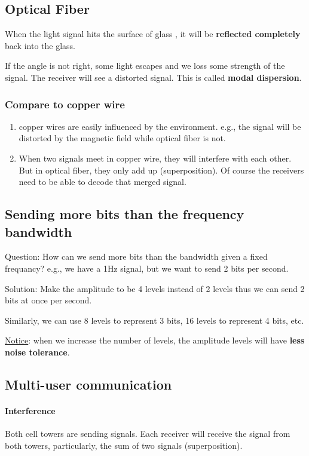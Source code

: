 \documentclass{../../ainote}
\begin{document}
\subsection{Optical Fiber}
When the light signal hits the surface of glass , it will be \textbf{reflected completely} back into the glass. 

If the angle is not right, some light escapes and we loss some strength of the signal. The receiver will see a distorted signal. This is called \textbf{modal dispersion}.

\subsubsection{Compare to copper wire}
\begin{enumerate}[leftmargin=*]
    \item copper wires are easily influenced by the environment. e.g., the signal will be distorted by the magnetic field while optical fiber is not.
    \item When two signals meet in copper wire, they will interfere with each other. But in optical fiber, they only add up (superposition). Of course the receivers need to be able to decode that merged signal.
\end{enumerate}

\subsection{Sending more bits than the frequency bandwidth}
Question: How can we send more bits than the bandwidth given a fixed frequancy? e.g., we have a 1Hz signal, but we want to send 2 bits per second.

Solution: Make the amplitude to be 4 levels instead of 2 levels thus we can send 2 bits at once per second.

Similarly, we can use 8 levels to represent 3 bits, 16 levels to represent 4 bits, etc.

\underline{Notice}: when we increase the number of levels, the amplitude levels will have \textbf{less noise tolerance}. 

\subsection{Multi-user communication}
\paragraph{Interference}\mbox\\
Both cell towers are sending signals. Each receiver will receive the signal from both towers, particularly, the sum of two signals (superposition).
\end{document}
